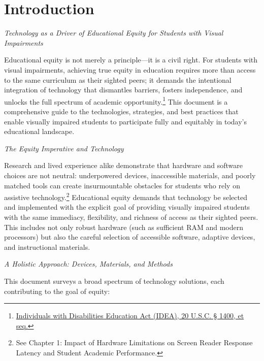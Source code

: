 \chapter*{Introduction}\label{intro}

\emph{Technology as a Driver of Educational Equity for Students with Visual Impairments}

Educational equity is not merely a principle—it is a civil right. For students with visual impairments, achieving true equity in education requires more than access to the same curriculum as their sighted peers; it demands the intentional integration of technology that dismantles barriers, fosters independence, and unlocks the full spectrum of academic opportunity.\footnote{\href{http://sites.ed.gov/idea/statuteregulations/}{Individuals with Disabilities Education Act (IDEA), 20 U.S.C. § 1400, et seq.}} This document is a comprehensive guide to the technologies, strategies, and best practices that enable visually impaired students to participate fully and equitably in today’s educational landscape.

\emph{The Equity Imperative and Technology}

Research and lived experience alike demonstrate that hardware and software choices are not neutral: underpowered devices, inaccessible materials, and poorly matched tools can create insurmountable obstacles for students who rely on assistive technology.\footnote{See Chapter 1: Impact of Hardware Limitations on Screen Reader Response Latency and Student Academic Performance.} Educational equity demands that technology be selected and implemented with the explicit goal of providing visually impaired students with the same immediacy, flexibility, and richness of access as their sighted peers. This includes not only robust hardware (such as sufficient RAM and modern processors) but also the careful selection of accessible software, adaptive devices, and instructional materials.

\emph{A Holistic Approach: Devices, Materials, and Methods}

This document surveys a broad spectrum of technology solutions, each contributing to the goal of equity:

